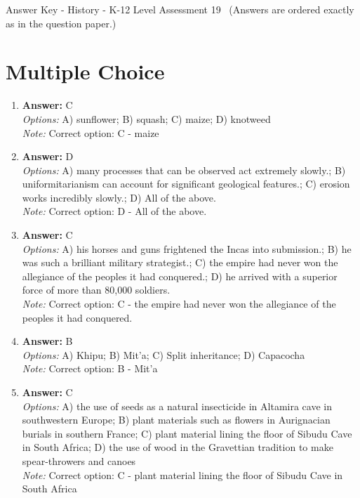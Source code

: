 \documentclass[12pt]{article}
\begin{document}
\begin{center}
Answer Key - History - K-12 Level Assessment 19 \
\small (Answers are ordered exactly as in the question paper.)
\end{center}

\section*{Multiple Choice}
\begin{enumerate}[label=\arabic*.]
\item \textbf{Answer:} C
\\ \textit{Options:} A) sunflower; B) squash; C) maize; D) knotweed
\\ \textit{Note:} Correct option: C - maize
\item \textbf{Answer:} D
\\ \textit{Options:} A) many processes that can be observed act extremely slowly.; B) uniformitarianism can account for significant geological features.; C) erosion works incredibly slowly.; D) All of the above.
\\ \textit{Note:} Correct option: D - All of the above.
\item \textbf{Answer:} C
\\ \textit{Options:} A) his horses and guns frightened the Incas into submission.; B) he was such a brilliant military strategist.; C) the empire had never won the allegiance of the peoples it had conquered.; D) he arrived with a superior force of more than 80,000 soldiers.
\\ \textit{Note:} Correct option: C - the empire had never won the allegiance of the peoples it had conquered.
\item \textbf{Answer:} B
\\ \textit{Options:} A) Khipu; B) Mit'a; C) Split inheritance; D) Capacocha
\\ \textit{Note:} Correct option: B - Mit'a
\item \textbf{Answer:} C
\\ \textit{Options:} A) the use of seeds as a natural insecticide in Altamira cave in southwestern Europe; B) plant materials such as flowers in Aurignacian burials in southern France; C) plant material lining the floor of Sibudu Cave in South Africa; D) the use of wood in the Gravettian tradition to make spear-throwers and canoes
\\ \textit{Note:} Correct option: C - plant material lining the floor of Sibudu Cave in South Africa
\end{enumerate}
\end{document}
